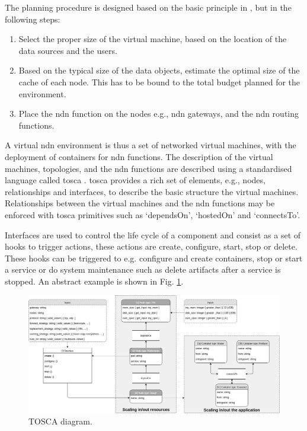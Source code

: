 \documentclass[conference]{IEEEtran}
\begin{document}
The planning procedure is designed based on the basic principle in \cite{mccabe2010network}, but in the following steps:
\begin{enumerate}
    \item Select the proper size of the virtual machine, based on the location of the data sources and the users.
    \item Based on the typical size of the data objects, estimate the optimal size of the cache of each node. This has to be bound to the total budget planned for the environment. 
    \item Place the \gls{ndn} function on the nodes e.g., \gls{ndn} gateways, and the \gls{ndn} routing functions. 
\end{enumerate}

A virtual \gls{ndn} environment is thus a set of networked virtual machines, with the deployment of containers for \gls{ndn} functions. The description of the virtual machines, topologies, and the \gls{ndn} functions are described using a standardised language called \gls{tosca} \cite{tosca-standard}.
\gls{tosca} provides a rich set of elements, e.g., nodes, relationships and interfaces, to describe the basic structure the virtual machines. Relationships between the virtual machines and the \gls{ndn} functions may be enforced with \gls{tosca} primitives such as `dependsOn', `hostedOn' and `connectsTo'. 

Interfaces are used to control the life cycle of a component and consist as a set of hooks to trigger actions, these actions are create, configure, start, stop or delete. These hooks can be triggered to e.g. configure and create containers, stop or start a service or do system maintenance such as delete artifacts after a service is stopped. An abstract example is shown in Fig. \ref{fig:tosca-diagram}.

\begin{figure}[ht]
\centering
\includegraphics[width=\textwidth]{images/tosca-diagram.png}
\caption{TOSCA diagram.}
\label{fig:tosca-diagram}
\end{figure}
\end{document}
